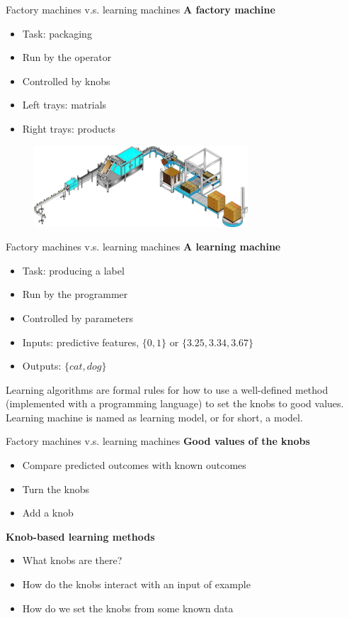 \documentclass{beamer}
\begin{document}
\begin{frame}{Factory machines v.s. learning machines}
\textbf{A factory machine}
\begin{itemize}
\item Task: packaging
\item Run by the operator
\item Controlled by knobs
\item Left trays: matrials
\item Right trays: products
\end{itemize}
\begin{figure}
\centering
\includegraphics[width=8cm]{ep4.jpeg}
\end{figure}
\end{frame}

\begin{frame}{Factory machines v.s. learning machines}
\textbf{A learning machine}
\begin{itemize}
\item Task: producing a label
\item Run by the programmer
\item Controlled by parameters
\item Inputs: predictive features, $\{0, 1\}$ or $\{3.25, 3.34, 3.67\}$
\item Outputs: $\{cat, dog\}$
\end{itemize}
\vspace{6pt}
Learning algorithms are formal rules for how to use a well-defined method (implemented with a programming language) to set the knobs to good values.\\[6pt]
Learning machine is named as learning model, or for short, a model.
\end{frame}

\begin{frame}{Factory machines v.s. learning machines}
\textbf{Good values of the knobs}
\begin{itemize}
\item Compare predicted outcomes with known outcomes
\item Turn the knobs
\item Add a knob
\end{itemize}
\vspace{6pt}
\textbf{Knob-based learning methods}
\begin{itemize}
\item What knobs are there?
\item How do the knobs interact with an input of example
\item How do we set the knobs from some known data
\end{itemize}
\end{frame}
\end{document}

